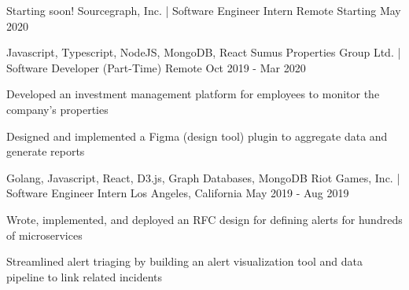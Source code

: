 

\begin{cventries}

  \cventry
    {Starting soon!} %
    {Sourcegraph, Inc. | Software Engineer Intern} %
    {Remote} %
    {Starting May 2020} %
    {
    }

  \cventry
    {Javascript, Typescript, NodeJS, MongoDB, React} %
    {Sumus Properties Group Ltd. | Software Developer (Part-Time)} %
    {Remote} %
    {Oct 2019 - Mar 2020} %
    {
      \begin{cvitems} %
        \item {Developed an investment management platform for employees to monitor the company's properties}
        \item {Designed and implemented a Figma (design tool) plugin to aggregate data and generate reports}
      \end{cvitems}
    }

  \cventry
    {Golang, Javascript, React, D3.js, Graph Databases, MongoDB} %
    {Riot Games, Inc. | Software Engineer Intern} %
    {Los Angeles, California} %
    {May 2019 - Aug 2019} %
    {
      \begin{cvitems} %
        \item {Wrote, implemented, and deployed an RFC design for defining alerts for hundreds of microservices}
        \item {Streamlined alert triaging by building an alert visualization tool and data pipeline to link related incidents}
      \end{cvitems}
    }


\end{cventries}
